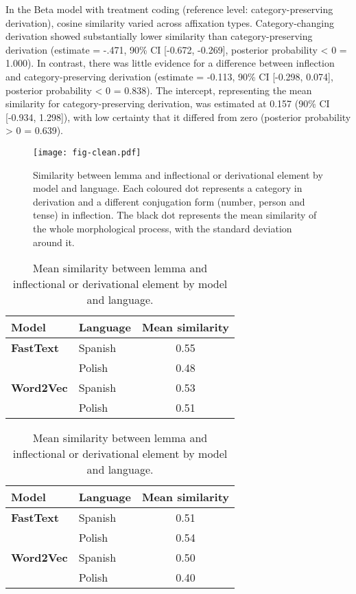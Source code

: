 \documentclass[12pt]{article}
\begin{document}
In the Beta model with treatment coding (reference level: category-preserving derivation), cosine similarity varied across affixation types. Category-changing derivation showed substantially lower similarity than category-preserving derivation (estimate = -.471, 90\% CI [-0.672, -0.269], posterior probability < 0 = 1.000). In contrast, there was little evidence for a difference between inflection and category-preserving derivation (estimate = -0.113, 90\% CI [-0.298, 0.074], posterior probability < 0 = 0.838). The intercept, representing the mean similarity for category-preserving derivation, was estimated at 0.157 (90\% CI [-0.934, 1.298]), with low certainty that it differed from zero (posterior probability > 0 = 0.639).

\begin{figure}[htbp]
\centering
\texttt{[image: fig-clean.pdf]}
\caption{Similarity between lemma and inflectional or derivational element by model and language. Each coloured dot represents a category in derivation and a different conjugation form (number, person and tense) in inflection. The black dot represents the mean similarity of the whole morphological process, with the standard deviation around it.}
\label{fig:clean-data}
\end{figure}

\begin{table}[h!]
\centering
\label{tbl:mean-similarity}
\begin{minipage}[t]{0.48\textwidth}
\footnotesize
\centering
{}
\begin{tabular}{llc}
\toprule
\textbf{Model} & \textbf{Language} & \textbf{Mean similarity} \\
\midrule
\textbf{FastText}  & Spanish & 0.55 \\
                   & Polish  & 0.48 \\
\textbf{Word2Vec}  & Spanish & 0.53 \\
                   & Polish  & 0.51 \\
\bottomrule
\end{tabular}
\end{minipage}
\hfill
\begin{minipage}[t]{0.48\textwidth}
\footnotesize
\centering
{}
\begin{tabular}{llc}
\toprule
\textbf{Model} & \textbf{Language} & \textbf{Mean similarity} \\
\midrule
\textbf{FastText}  & Spanish & 0.51 \\
                   & Polish  & 0.54 \\
\textbf{Word2Vec}  & Spanish & 0.50 \\
                   & Polish  & 0.40 \\
\bottomrule
\end{tabular}
\end{minipage}
\caption{Mean similarity between lemma and inflectional or derivational element by model and language.}
\end{table}
\end{document}

